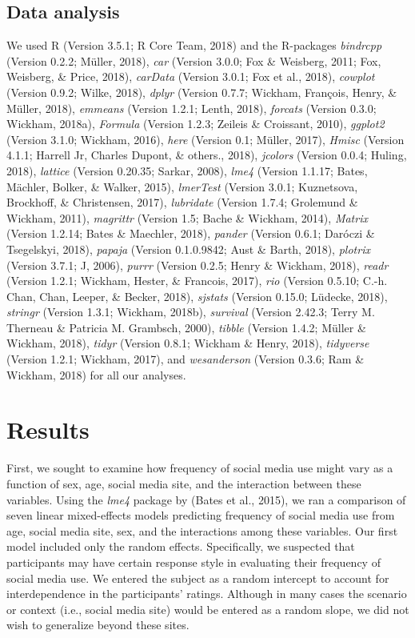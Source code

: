 \documentclass[man, fleqn, noextraspace]{apa6}
\theoremstyle{definition}
\theoremstyle{definition}
\theoremstyle{definition}
\theoremstyle{remark}
\begin{document}
\subsection{Data analysis}\label{data-analysis}

We used R (Version 3.5.1; R Core Team, 2018) and the R-packages
\emph{bindrcpp} (Version 0.2.2; Müller, 2018), \emph{car} (Version
3.0.0; Fox \& Weisberg, 2011; Fox, Weisberg, \& Price, 2018),
\emph{carData} (Version 3.0.1; Fox et al., 2018), \emph{cowplot}
(Version 0.9.2; Wilke, 2018), \emph{dplyr} (Version 0.7.7; Wickham,
François, Henry, \& Müller, 2018), \emph{emmeans} (Version 1.2.1; Lenth,
2018), \emph{forcats} (Version 0.3.0; Wickham, 2018a), \emph{Formula}
(Version 1.2.3; Zeileis \& Croissant, 2010), \emph{ggplot2} (Version
3.1.0; Wickham, 2016), \emph{here} (Version 0.1; Müller, 2017),
\emph{Hmisc} (Version 4.1.1; Harrell Jr, Charles Dupont, \& others.,
2018), \emph{jcolors} (Version 0.0.4; Huling, 2018), \emph{lattice}
(Version 0.20.35; Sarkar, 2008), \emph{lme4} (Version 1.1.17; Bates,
Mächler, Bolker, \& Walker, 2015), \emph{lmerTest} (Version 3.0.1;
Kuznetsova, Brockhoff, \& Christensen, 2017), \emph{lubridate} (Version
1.7.4; Grolemund \& Wickham, 2011), \emph{magrittr} (Version 1.5; Bache
\& Wickham, 2014), \emph{Matrix} (Version 1.2.14; Bates \& Maechler,
2018), \emph{pander} (Version 0.6.1; Daróczi \& Tsegelskyi, 2018),
\emph{papaja} (Version 0.1.0.9842; Aust \& Barth, 2018), \emph{plotrix}
(Version 3.7.1; J, 2006), \emph{purrr} (Version 0.2.5; Henry \& Wickham,
2018), \emph{readr} (Version 1.2.1; Wickham, Hester, \& Francois, 2017),
\emph{rio} (Version 0.5.10; C.-h. Chan, Chan, Leeper, \& Becker, 2018),
\emph{sjstats} (Version 0.15.0; Lüdecke, 2018), \emph{stringr} (Version
1.3.1; Wickham, 2018b), \emph{survival} (Version 2.42.3; Terry M.
Therneau \& Patricia M. Grambsch, 2000), \emph{tibble} (Version 1.4.2;
Müller \& Wickham, 2018), \emph{tidyr} (Version 0.8.1; Wickham \& Henry,
2018), \emph{tidyverse} (Version 1.2.1; Wickham, 2017), and
\emph{wesanderson} (Version 0.3.6; Ram \& Wickham, 2018) for all our
analyses.

\section{Results}\label{results}

First, we sought to examine how frequency of social media use might vary
as a function of sex, age, social media site, and the interaction
between these variables. Using the \emph{lme4} package by (Bates et al.,
2015), we ran a comparison of seven linear mixed-effects models
predicting frequency of social media use from age, social media site,
sex, and the interactions among these variables. Our first model
included only the random effects. Specifically, we suspected that
participants may have certain response style in evaluating their
frequency of social media use. We entered the subject as a random
intercept to account for interdependence in the participants' ratings.
Although in many cases the scenario or context (i.e., social media site)
would be entered as a random slope, we did not wish to generalize beyond
these sites.
\end{document}
